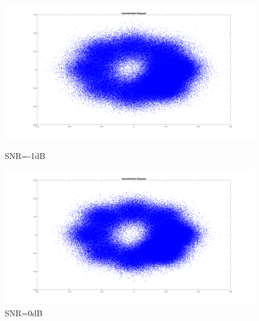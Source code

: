 \begin{spacing}{1.5}
\begin{figure}[H]
\begin{minipage}[t]{0.5\linewidth}
\centering
\includegraphics[width=0.9\columnwidth]{constellation5.png}
\caption{SNR=-1dB}
\end{minipage}
\hfill
\begin{minipage}[t]{0.5\linewidth}
\centering
\includegraphics[width=0.9\columnwidth]{constellation6.png}
\caption{SNR=0dB}
\end{minipage}
\end{figure}



\end{spacing}

